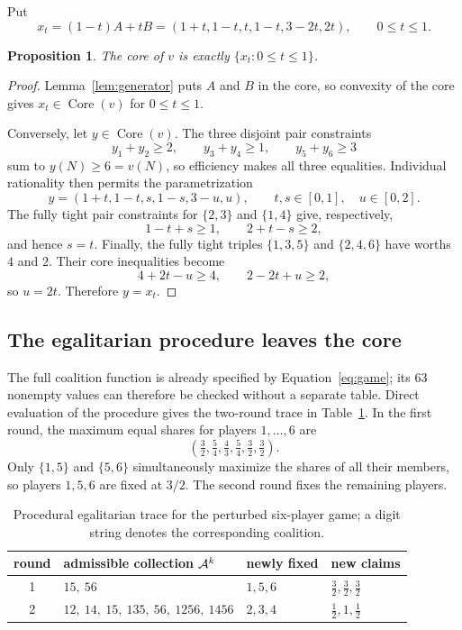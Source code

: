 \documentclass[11pt]{article}
\newtheorem{proposition}[theorem]{Proposition}
\newcommand{\core}{\operatorname{Core}}
\begin{document}
Put
\begin{equation}\label{eq:xt}
 x_t=(1-t)A+tB
     =(1+t,1-t,t,1-t,3-2t,2t),
 \qquad 0\le t\le1.
\end{equation}

\begin{proposition}\label{prop:core}
The core of $v$ is exactly $\{x_t:0\le t\le1\}$.
\end{proposition}

\begin{proof}
Lemma~\ref{lem:generator} puts $A$ and $B$ in the core, so convexity of the
core gives $x_t\in\core(v)$ for $0\le t\le1$.

Conversely, let $y\in\core(v)$. The three disjoint pair constraints
\[
 y_1+y_2\ge2,\qquad y_3+y_4\ge1,\qquad y_5+y_6\ge3
\]
sum to $y(N)\ge6=v(N)$, so efficiency makes all three equalities. Individual
rationality then permits the parametrization
\[
 y=(1+t,1-t,s,1-s,3-u,u),
 \qquad t,s\in[0,1],\quad u\in[0,2].
\]
The fully tight pair constraints for $\{2,3\}$ and $\{1,4\}$ give,
respectively,
\[
 1-t+s\ge1,\qquad 2+t-s\ge2,
\]
and hence $s=t$. Finally, the fully tight triples $\{1,3,5\}$ and
$\{2,4,6\}$ have worths $4$ and $2$. Their core inequalities become
\[
 4+2t-u\ge4,\qquad 2-2t+u\ge2,
\]
so $u=2t$. Therefore $y=x_t$.
\end{proof}

\subsection{The egalitarian procedure leaves the core}

The full coalition function is already specified by
Equation~\eqref{eq:game}; its $63$ nonempty values can therefore be checked
without a separate table. Direct evaluation of the procedure gives the
two-round trace in Table~\ref{tab:trace}. In the first round, the maximum
equal shares for players $1,\dots,6$ are
\[
 \left(\tfrac32,\tfrac54,\tfrac43,\tfrac54,\tfrac32,\tfrac32\right).
\]
Only $\{1,5\}$ and $\{5,6\}$ simultaneously maximize the shares of all their
members, so players $1,5,6$ are fixed at $3/2$. The second round fixes the
remaining players.

\begin{table}[ht]
\centering
\small
\caption{Procedural egalitarian trace for the perturbed six-player game; a
digit string denotes the corresponding coalition.}
\label{tab:trace}
\begin{tabular}{@{}c p{3.55in} l l@{}}
\toprule
round & admissible collection ${\cal A}^k$
      & newly fixed & new claims\\
\midrule
1 & $15,\ 56$
  & $1,5,6$ & $\tfrac32,\tfrac32,\tfrac32$\\[2pt]
2 & $12,\ 14,\ 15,\ 135,\ 56,\ 1256,\ 1456$
  & $2,3,4$ & $\tfrac12,1,\tfrac12$\\
\bottomrule
\end{tabular}
\end{table}
\end{document}
